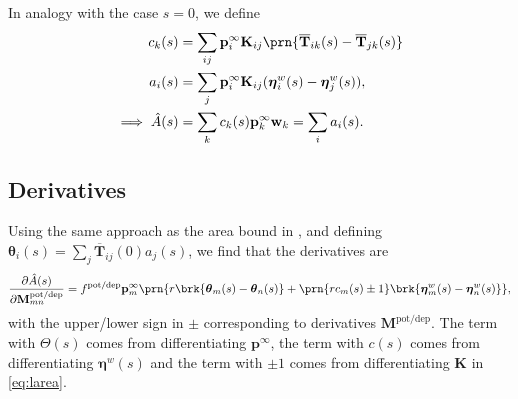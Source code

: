 \documentclass[12pt]{article}
\newcommand{\pr}{\mathbf{p}}
\newcommand{\eq}{\pr^\infty}
\newcommand{\fpt}{\mathbf{T}}
\newcommand{\fptb}{\overline{\fpt}}
\newcommand{\etw}{\boldsymbol{\eta}^w}
\newcommand{\thb}{\boldsymbol{\theta}}
\newcommand{\w}{\mathbf{w}}
\newcommand{\M}{\mathbf{M}}
\newcommand{\enc}{\mathbf{K}}
\newcommand{\potdep}{^{\text{pot/dep}}}
\renewcommand{\pdiff}[2]{\frac{\partial #1}{\partial #2}}
\begin{document}
In analogy with the case $s=0$, we define
%
\begin{equation}\label{eq:lareacoeffs}
  \begin{aligned}
    c_k(s) &= \sum_{ij} \eq_i \enc_{ij} \prn{\fptb_{ik}(s)-\fptb_{jk}(s)} \\
    a_i(s) &= \sum_j \eq_i \enc_{ij} (\etw_{i}(s) - \etw_{j}(s)),\\
    \implies
    \hat{A}(s) &= \sum_k c_k(s) \eq_k \w_k
      = \sum_i a_i(s).
  \end{aligned}
\end{equation}
%

\subsection{Derivatives}\label{sec:lderiv}

Using the same approach as the area bound in \cite{Lahiri2013synapse}, and defining $\thb_i(s) = \sum_j \fptb_{ij}(0) a_j(s)$,  we find that the derivatives are
%
\begin{equation}\label{eq:lAdiff}
  \pdiff{\hat{A}(s)}{\M\potdep_{mn}}
     = f\potdep \eq_m \prn{ r \brk{\thb_m(s) - \thb_n(s)}
     +\prn{rc_m(s) \pm 1} \brk{\etw_m(s) - \etw_n(s)} },
\end{equation}
%
with the upper/lower sign in $\pm$ corresponding to derivatives \wrt $\M\potdep$.
The term with $\Theta(s)$ comes from differentiating $\eq$, the term with $c(s)$ comes from differentiating $\etw(s)$ and the term with $\pm1$ comes from differentiating $\enc$ in \eqref{eq:larea}.
\end{document}
